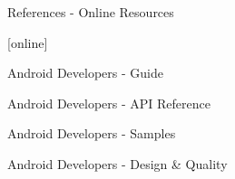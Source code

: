 
\begin{frame}{References - Online Resources}
\begin{thebibliography}{99}
[online]

 Android Developers - Guide
\newblock {}

 Android Developers - API Reference
\newblock {}

 Android Developers - Samples
\newblock {}

 Android Developers - Design \& Quality
\newblock {}

\end{thebibliography}
\end{frame}


%
%
%
%
